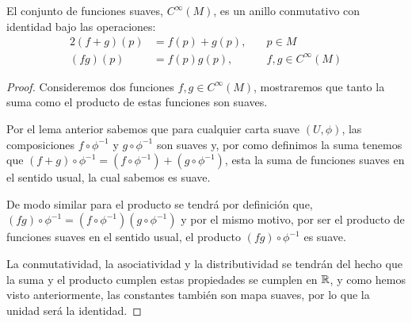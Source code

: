 \begin{theorem}
	El conjunto de funciones suaves, $C^{\infty}(M)$, es un anillo conmutativo con identidad bajo las operaciones:
	\begin{alignat*}{2}
		(f+g)(p) & = f(p) + g(p), \quad & p \in M               \\
		(fg)(p)  & = f(p)g(p),          & f,g \in C^{\infty}(M)
	\end{alignat*}
\end{theorem}

\begin{proof}
  Consideremos dos funciones $f,g \in C^{\infty}(M)$, mostraremos que tanto la suma como el producto de estas funciones son suaves.

  Por el lema anterior sabemos que para cualquier carta suave $(U,\phi)$, las composiciones $f \circ \phi^{-1}$ y $g \circ \phi^{-1}$ son suaves y, por como definimos la suma tenemos que $(f + g)\circ \phi^{-1} = (f \circ \phi^{-1}) + (g \circ \phi^{-1})$, esta la suma de funciones suaves en el sentido usual, la cual sabemos es suave.

  De modo similar para el producto se tendrá por definición que, $(fg)\circ\phi^{-1} = (f \circ \phi^{-1}) (g \circ \phi^{-1})$ y por el mismo motivo, por ser el producto de funciones suaves en el sentido usual, el producto $(fg) \circ \phi^{-1}$ es suave.

  La conmutatividad, la asociatividad y la distributividad se tendrán del hecho que la suma y el producto cumplen estas propiedades se cumplen en $\mathbb{R}$, y como hemos visto anteriormente, las constantes también son mapa suaves, por lo que la unidad será la identidad.
\end{proof}
